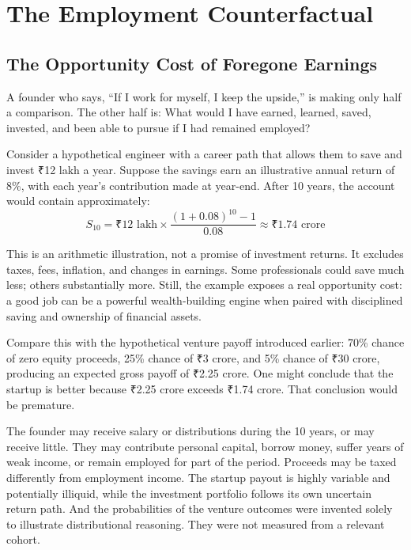 \section{The Employment Counterfactual}

\subsection{The Opportunity Cost of Foregone Earnings}

A founder who says, ``If I work for myself, I keep the upside,'' is making only half a comparison. The other half is: What would I have earned, learned, saved, invested, and been able to pursue if I had remained employed?

Consider a hypothetical engineer with a career path that allows them to save and invest ₹12 lakh a year. Suppose the savings earn an illustrative annual return of 8\%, with each year's contribution made at year-end. After 10 years, the account would contain approximately:
\begin{equation}
  S_{10} = ₹12\text{ lakh} \times \frac{(1 + 0.08)^{10} - 1}{0.08} \approx ₹1.74\text{ crore} \label{eq:counterfactual-savings}
\end{equation}

This is an arithmetic illustration, not a promise of investment returns. It excludes taxes, fees, inflation, and changes in earnings. Some professionals could save much less; others substantially more. Still, the example exposes a real opportunity cost: a good job can be a powerful wealth-building engine when paired with disciplined saving and ownership of financial assets.

Compare this with the hypothetical venture payoff introduced earlier: 70\% chance of zero equity proceeds, 25\% chance of ₹3 crore, and 5\% chance of ₹30 crore, producing an expected gross payoff of ₹2.25 crore. One might conclude that the startup is better because ₹2.25 crore exceeds ₹1.74 crore. That conclusion would be premature.

The founder may receive salary or distributions during the 10 years, or may receive little. They may contribute personal capital, borrow money, suffer years of weak income, or remain employed for part of the period. Proceeds may be taxed differently from employment income. The startup payout is highly variable and potentially illiquid, while the investment portfolio follows its own uncertain return path. And the probabilities of the venture outcomes were invented solely to illustrate distributional reasoning. They were not measured from a relevant cohort.

